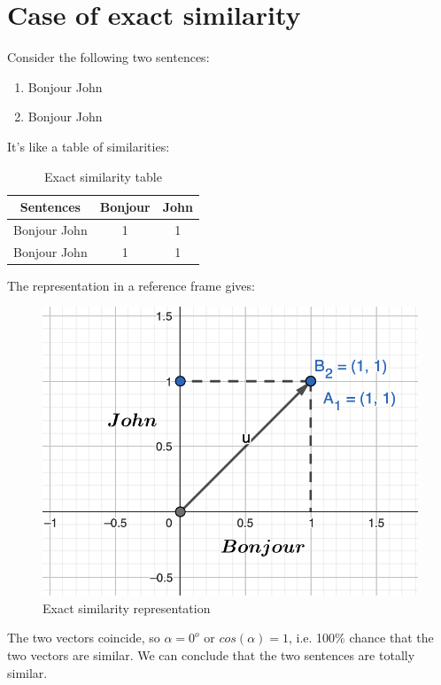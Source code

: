 \documentclass[a4paper, 14pt]{article}
\begin{document}
    \section{Case of exact similarity}
    Consider the following two sentences:
    \begin{enumerate}
    	\item Bonjour John
    	\item Bonjour John
    \end{enumerate}
    It's like a table of similarities:
    \begin{table}[H]
    	\centering
    	\begin{tabular}{|c|c|c|}
    		\hline
    		\textbf{Sentences} & \textbf{Bonjour} & \textbf{John} \\
    		\hline
    		Bonjour John & 1 & 1 \\
    		Bonjour John  & 1 & 1 \\
    		\hline
    	\end{tabular}
    	\caption{Exact similarity table}
    	\label{tab:similariteexacte}
    \end{table}
    \newpage
    The representation in a reference frame gives:
    \begin{figure}[H]
    	\includegraphics[scale=0.5, width=15cm]{./img/vecteur_similitude_exacte.png}
    	\caption{Exact similarity representation}
    \end{figure}
    The two vectors coincide, so $\alpha = 0^{o}$ or $cos(\alpha)=1$, i.e. 100\% chance that the two vectors are similar. We can conclude that the two sentences are totally similar.
\end{document}
